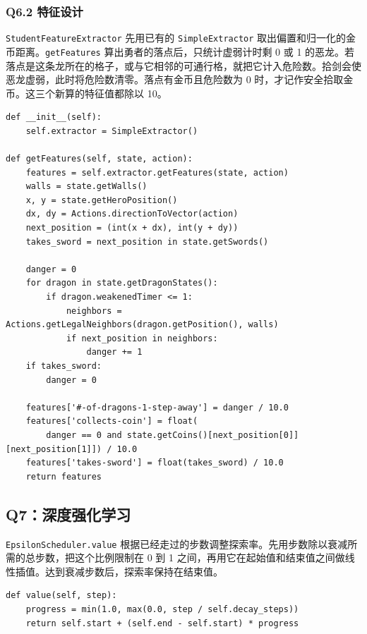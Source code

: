 \documentclass[UTF8,fontset=fandol,a4paper,11pt]{ctexart}
\newcommand{\code}[1]{\texttt{#1}}
\begin{document}
\newpage
\subsubsection*{Q6.2 特征设计}

\code{StudentFeatureExtractor} 先用已有的 \code{SimpleExtractor} 取出偏置和归一化的金币距离。\code{getFeatures} 算出勇者的落点后，只统计虚弱计时剩 0 或 1 的恶龙。若落点是这条龙所在的格子，或与它相邻的可通行格，就把它计入危险数。拾剑会使恶龙虚弱，此时将危险数清零。落点有金币且危险数为 0 时，才记作安全拾取金币。这三个新算的特征值都除以 10。

\begin{lstlisting}
def __init__(self):
    self.extractor = SimpleExtractor()

def getFeatures(self, state, action):
    features = self.extractor.getFeatures(state, action)
    walls = state.getWalls()
    x, y = state.getHeroPosition()
    dx, dy = Actions.directionToVector(action)
    next_position = (int(x + dx), int(y + dy))
    takes_sword = next_position in state.getSwords()

    danger = 0
    for dragon in state.getDragonStates():
        if dragon.weakenedTimer <= 1:
            neighbors = Actions.getLegalNeighbors(dragon.getPosition(), walls)
            if next_position in neighbors:
                danger += 1
    if takes_sword:
        danger = 0

    features['#-of-dragons-1-step-away'] = danger / 10.0
    features['collects-coin'] = float(
        danger == 0 and state.getCoins()[next_position[0]][next_position[1]]) / 10.0
    features['takes-sword'] = float(takes_sword) / 10.0
    return features
\end{lstlisting}

\subsection{Q7：深度强化学习}

\code{EpsilonScheduler.value} 根据已经走过的步数调整探索率。先用步数除以衰减所需的总步数，把这个比例限制在 0 到 1 之间，再用它在起始值和结束值之间做线性插值。达到衰减步数后，探索率保持在结束值。
\begin{lstlisting}
def value(self, step):
    progress = min(1.0, max(0.0, step / self.decay_steps))
    return self.start + (self.end - self.start) * progress
\end{lstlisting}
\end{document}
